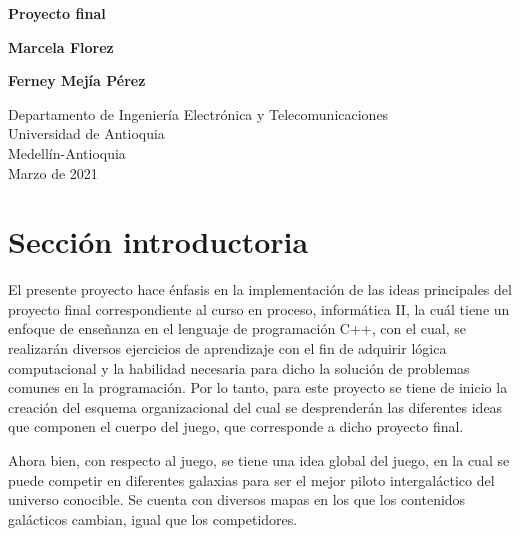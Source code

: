 \documentclass{article}
\begin{document}
\begin{titlepage}
    \begin{center}
        \vspace*{1cm}
            
        \Huge
        \textbf{Proyecto final}
            
        \vspace{0.5cm}
        \LARGE
            
            
        \vspace{1.5cm}
        
        \textbf{Marcela Florez} 
        
        \textbf{Ferney Mejía Pérez}
            
        \vfill
            
        \vspace{0.8cm}
            
        \Large
        Departamento de Ingeniería Electrónica y Telecomunicaciones\\
        Universidad de Antioquia\\
        Medellín-Antioquia\\
        Marzo de 2021
            
    \end{center}
\end{titlepage}

\tableofcontents
\newpage
\section{Sección introductoria}\label{intro}
El presente proyecto hace énfasis en la implementación de las ideas principales del proyecto final correspondiente al curso en proceso, informática II, la cuál tiene un enfoque de enseñanza en el lenguaje de programación C++, con el cual, se realizarán diversos ejercicios de aprendizaje con el fin de adquirir lógica computacional y la habilidad necesaria para dicho la solución de problemas comunes en la programación. Por lo tanto, para este proyecto se tiene de inicio la creación del esquema organizacional del cual se desprenderán las diferentes ideas que componen el cuerpo del juego, que corresponde a dicho proyecto final.

Ahora bien, con respecto al juego, se tiene una idea global del juego, en la cual se puede competir en diferentes galaxias para ser el mejor piloto intergaláctico del universo conocible. Se cuenta con diversos mapas en los que los contenidos galácticos cambian, igual que los competidores. 
\end{document}
